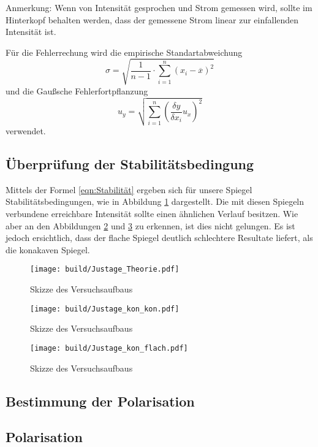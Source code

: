 Anmerkung: Wenn von Intensität gesprochen und Strom gemessen wird, sollte im Hinterkopf behalten werden, dass der gemessene Strom linear zur einfallenden Intensität ist.

Für die Fehlerrechung wird die empirische Standartabweichung
\begin{equation}
  \sigma = \sqrt{\frac{1}{n-1} \cdot \sum_{i=1}^n(x_i-\overline{x})^2}
  \label{eqn:Stdabweichung}
\end{equation}
und die Gaußsche Fehlerfortpflanzung
\begin{equation}
  u_y = \sqrt{\sum_{i=1}^n\left(\frac{\delta y}{\delta x_i}u_x\right)^2}
  \label{eqn:gauß}
\end{equation}
verwendet.

\subsection{Überprüfung der Stabilitätsbedingung}
Mittels der Formel \eqref{eqn:Stabilität} ergeben sich für unsere Spiegel Stabilitätsbedingungen, wie in Abbildung \ref{fig:Stabilität_Theorie} dargestellt. 
Die mit diesen Spiegeln verbundene erreichbare Intensität sollte einen ähnlichen Verlauf besitzen.
Wie aber an den Abbildungen \ref{fig:Stabilität_kon_kon} und \ref{fig:Stabilität_kon_flach} zu erkennen, ist dies nicht gelungen.
Es ist jedoch ersichtlich, dass der flache Spiegel deutlich schlechtere Resultate liefert, als die konakaven Spiegel.

\begin{figure}
  \centering
  \texttt{[image: build/Justage\_Theorie.pdf]}
  \caption{Skizze des Versuchsaufbaus}
  \label{fig:Stabilität_Theorie}
\end{figure}


\begin{figure}
  \centering
  \texttt{[image: build/Justage\_kon\_kon.pdf]}
  \caption{Skizze des Versuchsaufbaus}
  \label{fig:Stabilität_kon_kon}
\end{figure}

\begin{figure}
  \centering
  \texttt{[image: build/Justage\_kon\_flach.pdf]}
  \caption{Skizze des Versuchsaufbaus}
  \label{fig:Stabilität_kon_flach}
\end{figure}

\subsection{Bestimmung der Polarisation}
\subsection{Polarisation}

